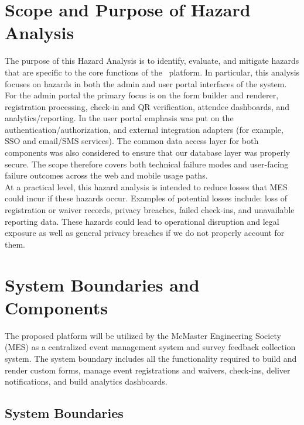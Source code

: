\documentclass[12pt]{article}
\begin{document}
\section{Scope and Purpose of Hazard Analysis}
The purpose of this Hazard Analysis is to identify, evaluate, and mitigate hazards that are specific to the core functions of the \teamname \ platform. In particular, this analysis focuses on hazards in both the admin and user portal interfaces of the system. For the admin portal the primary focus is on the form builder and renderer, registration processing, check-in and QR verification, attendee dashboards, and analytics/reporting. In the user portal emphasis was put on the authentication/authorization, and external integration adapters (for example, SSO and email/SMS services). The common data access layer for both components was also considered to ensure that our database layer was properly secure.  The scope therefore covers both technical failure modes and user-facing failure outcomes across the web and mobile usage paths.\\
At a practical level, this hazard analysis is intended to reduce losses that MES could incur if these hazards occur. Examples of potential losses include: loss of registration or waiver records, privacy breaches, failed check-ins, and unavailable reporting data. These hazards could lead to operational disruption and legal exposure as well as general privacy breaches if we do not properly account for them.


\section{System Boundaries and Components}

The proposed platform will be utilized by the McMaster Engineering Society (MES)
as a centralized event management system and survey feedback collection system.
The system boundary includes all the functionality required to build and render
custom forms, manage event registrations and waivers, check-ins, deliver
notifications, and build analytics dashboards.

\subsection{System Boundaries}
\end{document}
